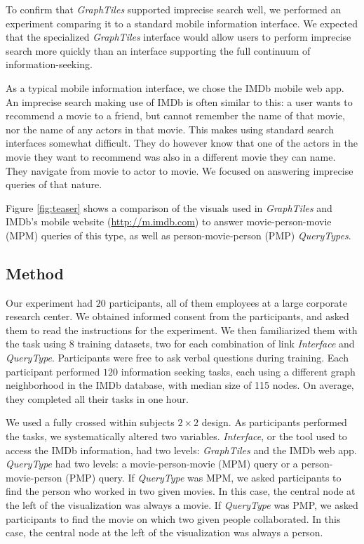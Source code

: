 To confirm that \textit{GraphTiles} supported imprecise search well, we performed an experiment comparing it to a standard mobile information interface. We expected that the specialized \textit{GraphTiles} interface would allow users to perform imprecise search more quickly than an interface supporting the full continuum of information-seeking.

As a typical mobile information interface, we chose the IMDb mobile web app. An imprecise search making use of IMDb is often similar to this: a user wants to recommend a movie to a friend, but cannot remember the name of that movie, nor the name of any actors in that movie. This makes using standard search interfaces somewhat difficult. They do however know that one of the actors in the movie they want to recommend was also in a different movie they can name. They navigate from movie to actor to movie. We focused on answering imprecise queries of that nature. 

Figure \ref{fig:teaser} shows a comparison of the visuals used in \textit{GraphTiles} and IMDb's mobile website (\url{http://m.imdb.com}) to answer movie-person-movie (MPM) queries of this type, as well as person-movie-person (PMP) \textit{QueryTypes}.


\subsection{Method}

Our experiment had $20$ participants, all of them employees at a large corporate research center.  We obtained informed consent from the participants, and asked them to read the instructions for the experiment. We then familiarized them with the task using 8 training datasets, two for each combination of link \textit{Interface} and \textit{QueryType}. Participants were free to ask verbal questions during training. Each participant performed $120$ information seeking tasks, each using a different graph neighborhood in the IMDb database, with median size of 115 nodes. On average, they completed all their tasks in one hour.

We used a fully crossed within subjects $2 \times 2$ design. As participants performed the tasks, we systematically altered two variables. \textit{Interface}, or the tool used to access the IMDb information, had two levels: \textit{GraphTiles} and the IMDb web app. \textit{QueryType} had two levels: a movie-person-movie (MPM) query or a person-movie-person (PMP) query. If \textit{QueryType} was MPM, we asked participants to find the person who worked in two given movies. In this case, the central node at the left of the visualization was always a movie. If \textit{QueryType} was PMP, we asked participants to find the movie on which two given people collaborated. In this case, the central node at the left of the visualization was always a person. 

